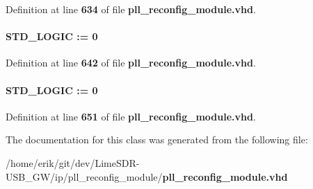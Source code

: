 Definition at line {\bf 634} of file {\bf pll\+\_\+reconfig\+\_\+module.\+vhd}.

\paragraph[{write\+\_\+init\+\_\+state}]{ {\bfseries \textcolor{comment}{S\+T\+D\+\_\+\+L\+O\+G\+IC}\textcolor{vhdlchar}{ }\textcolor{vhdlchar}{ }\textcolor{vhdlchar}{\+:}\textcolor{vhdlchar}{=}\textcolor{vhdlchar}{ }\textcolor{vhdlchar}{ }\textcolor{vhdlchar}{\textquotesingle{}}\textcolor{vhdlchar}{ } \textcolor{vhdldigit}{0} \textcolor{vhdlchar}{ }\textcolor{vhdlchar}{\textquotesingle{}}\textcolor{vhdlchar}{ }} \hspace{0.3cm}{\ttfamily [Signal]}}\label{classpll__reconfig__module__pllrcfg__ok11_1_1RTL_a75662cb0f3c1d9969a4f476c9da3ce24}


Definition at line {\bf 642} of file {\bf pll\+\_\+reconfig\+\_\+module.\+vhd}.

\paragraph[{write\+\_\+nominal\+\_\+state}]{ {\bfseries \textcolor{comment}{S\+T\+D\+\_\+\+L\+O\+G\+IC}\textcolor{vhdlchar}{ }\textcolor{vhdlchar}{ }\textcolor{vhdlchar}{\+:}\textcolor{vhdlchar}{=}\textcolor{vhdlchar}{ }\textcolor{vhdlchar}{ }\textcolor{vhdlchar}{\textquotesingle{}}\textcolor{vhdlchar}{ } \textcolor{vhdldigit}{0} \textcolor{vhdlchar}{ }\textcolor{vhdlchar}{\textquotesingle{}}\textcolor{vhdlchar}{ }} \hspace{0.3cm}{\ttfamily [Signal]}}\label{classpll__reconfig__module__pllrcfg__ok11_1_1RTL_adb77204ceba399996e6353ba70174e09}


Definition at line {\bf 651} of file {\bf pll\+\_\+reconfig\+\_\+module.\+vhd}.



The documentation for this class was generated from the following file\+:\begin{DoxyCompactItemize}
\item 
/home/erik/git/dev/\+Lime\+S\+D\+R-\/\+U\+S\+B\+\_\+\+G\+W/ip/pll\+\_\+reconfig\+\_\+module/{\bf pll\+\_\+reconfig\+\_\+module.\+vhd}\end{DoxyCompactItemize}
